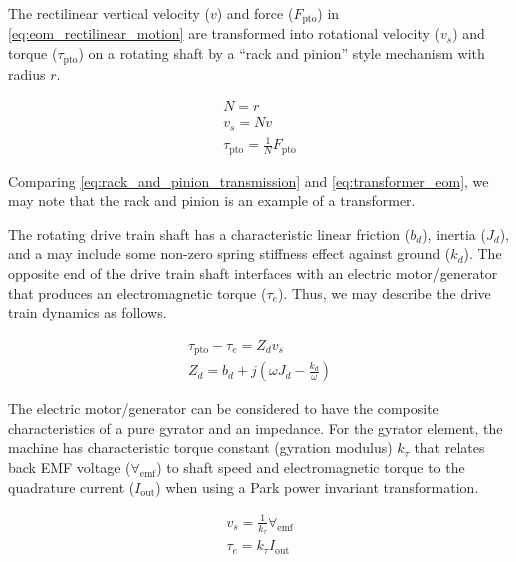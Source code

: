 \documentclass[lettersize,journal]{IEEEtran}
\begin{document}
The rectilinear vertical velocity ($v$) and force ($F_{\textrm{pto}}$) in \eqref{eq:eom_rectilinear_motion} are transformed into rotational velocity ($v_s$) and torque ($\tau_{\textrm{pto}}$) on a rotating shaft by a ``rack and pinion'' style mechanism with radius $r$.

\begin{subequations}
        \begin{gather}
                N = r \\
                v_s = N v \\
                \tau_{\textrm{pto}} = \frac{1}{N} F_{\textrm{pto}}
        \end{gather}
        \label{eq:rack_and_pinion_transmission}
\end{subequations}

\noindent{}Comparing \eqref{eq:rack_and_pinion_transmission} and \eqref{eq:transformer_eom}, we may note that the rack and pinion is an example of a transformer.

The rotating drive train shaft has a characteristic linear friction ($b_d$), inertia ($J_d$), and a may include some non-zero spring stiffness effect against ground ($k_d$).
The opposite end of the drive train shaft interfaces with an electric motor/generator that produces an electromagnetic torque ($\tau_e$).
Thus, we may describe the drive train dynamics as follows.

\begin{subequations}
        \begin{gather}
                \tau_{\textrm{pto}} - \tau_e = Z_d v_s \\
                Z_d = b_d + j \left( \omega J_d - \frac{k_d}{\omega} \right)
        \end{gather}
\end{subequations}

The electric motor/generator can be considered to have the composite characteristics of a pure gyrator and an impedance.
For the gyrator element, the machine has characteristic torque constant (gyration modulus) $k_\tau$ that relates back EMF voltage ($\forall_{\textrm{emf}}$) to shaft speed and electromagnetic torque to the quadrature current ($I_{\textrm{out}}$) when using a Park power invariant transformation.

\begin{subequations}
        \begin{gather}
                v_s = \frac{1}{k_\tau}\forall_{\textrm{emf}} \\
                \tau_e = k_\tau I_{\textrm{out}}
        \end{gather}
\end{subequations}
\end{document}
